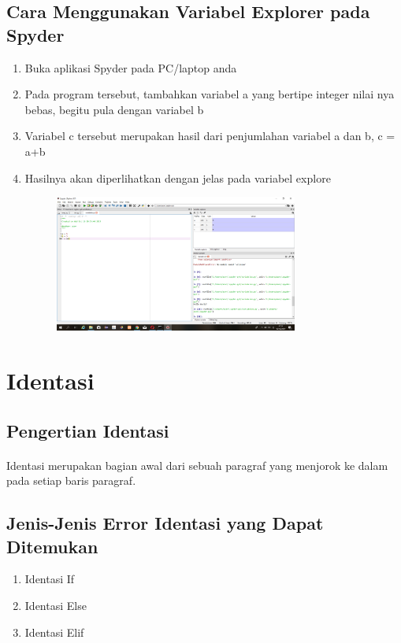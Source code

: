 \documentclass{article}
\begin{document}
\subsection{Cara Menggunakan Variabel Explorer pada Spyder}
\begin{enumerate}
    \item Buka aplikasi Spyder pada PC/laptop anda
    \item Pada program tersebut, tambahkan variabel a yang bertipe integer nilai nya bebas, begitu pula dengan variabel b
    \item Variabel c tersebut merupakan hasil dari penjumlahan variabel a dan b, c = a+b
    \item Hasilnya akan diperlihatkan dengan jelas pada variabel explore
        \begin{figure}[h]
            \centerline{\includegraphics[width=8cm]{image/variabelex.png}}
        \end{figure}
\end{enumerate}

\section{Identasi}
\subsection{Pengertian Identasi}
\paragraph{}
    Identasi merupakan bagian awal dari sebuah paragraf yang menjorok ke dalam pada setiap baris paragraf.
\subsection{Jenis-Jenis Error Identasi yang Dapat Ditemukan}
\begin{enumerate}
    \item Identasi If
    \item Identasi Else
    \item Identasi Elif
\end{enumerate}
\end{document}
